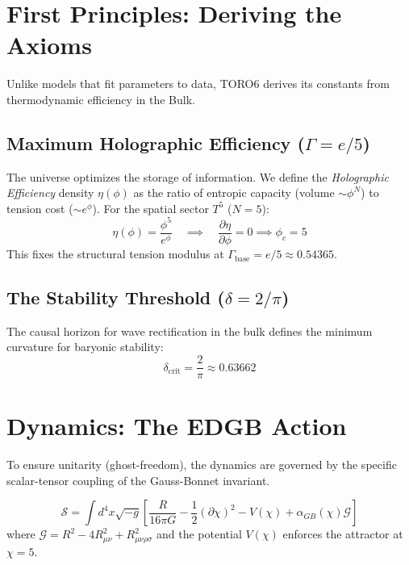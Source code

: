 \documentclass[aps,prd,twocolumn,superscriptaddress,showpacs,amsmath,amssymb,floatfix,nofootinbib]{revtex4-2}
\newcommand{\Tension}{\Gamma_{\mathrm{base}}}
\newcommand{\Threshold}{\delta_{\mathrm{crit}}}
\begin{document}
\section{First Principles: Deriving the Axioms}

Unlike models that fit parameters to data, TORO6 derives its constants from thermodynamic efficiency in the Bulk.

\subsection{Maximum Holographic Efficiency ($\Gamma = e/5$)}
The universe optimizes the storage of information. We define the \textit{Holographic Efficiency} density $\eta(\phi)$ as the ratio of entropic capacity (volume $\sim \phi^N$) to tension cost ($\sim e^\phi$). For the spatial sector $T^5$ ($N=5$):
\begin{equation}
\eta(\phi) = \frac{\phi^5}{e^\phi} \quad \implies \quad \frac{\partial \eta}{\partial \phi} = 0 \implies \phi_c = 5
\end{equation}
This fixes the structural tension modulus at $\Tension = e/5 \approx 0.54365$.

\subsection{The Stability Threshold ($\delta = 2/\pi$)}
The causal horizon for wave rectification in the bulk defines the minimum curvature for baryonic stability:
\begin{equation}
\Threshold = \frac{2}{\pi} \approx 0.63662
\end{equation}

\section{Dynamics: The EDGB Action}

To ensure unitarity (ghost-freedom), the dynamics are governed by the specific scalar-tensor coupling of the Gauss-Bonnet invariant.

\begin{equation}
\mathcal{S} = \int d^4x \sqrt{-g} \left[ \frac{R}{16\pi G} - \frac{1}{2}(\partial \chi)^2 - V(\chi) + \alpha_{GB}(\chi) \mathcal{G} \right]
\end{equation}
where $\mathcal{G} = R^2 - 4R_{\mu\nu}^2 + R_{\mu\nu\rho\sigma}^2$ and the potential $V(\chi)$ enforces the attractor at $\chi=5$.
\end{document}
